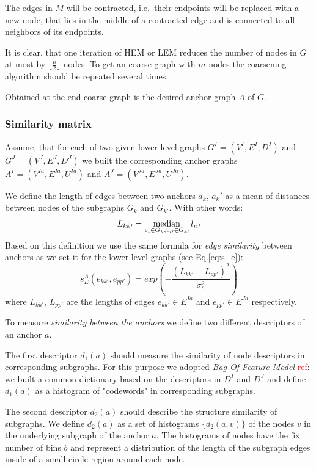\documentclass[
	fontsize=12pt,
	paper=a4,
	twoside=false,
	numbers=noenddot,
	plainheadsepline,
	toc=listof,
	toc=bibliography
]{scrartcl}
\def\median{\mathop{\rm median}} 						%
\newcommand\ToDo[1]{\textcolor{red}{#1}}
\begin{document}
The edges in $M$ will be contracted, i.e.\ their endpoints will be replaced with a new node, that lies in the middle of a contracted edge and is connected to all neighbors of its endpoints.

It is clear, that one iteration of HEM or LEM reduces the number of nodes in $G$ at most by $\lfloor\frac{n}{2} \rfloor$ nodes. To get an coarse graph with $m$ nodes the coarsening algorithm should be repeated several times.

Obtained at the end coarse graph is the desired anchor graph $A$ of $G$. 

\subsubsection{Similarity matrix}

Assume, that for each of two given lower level graphs $G^I = (V^I, E^I, D^I)$ and $G^J=(V^J, E^J, D^J)$ we built the corresponding anchor graphs  $A^I=(V^{Ia},E^{Ia}, U^{Ia})$ and $A^J=(V^{Ja},E^{Ja},U^{Ja})$. 

We define the length of edges between two anchors $a_k$, $a_k\prime$ as a mean of distances between nodes of the subgraphs $G_k$ and $G_{k\prime}$. With other words:
\begin{equation} L_{kk\prime} = \median_{v_i\in G_k, v_{i\prime}\in G_{k\prime}} l_{ii\prime} \end{equation}
Based on this definition we use the same formula for \emph{edge similarity} between anchors as we set it for the lower level graphs (see Eq.\ref{eq:s_e}):
\begin{equation} 
s^A_E(e_{kk\prime}, e_{pp\prime}) = exp(-\frac{(L_{kk\prime} - L_{pp\prime})^2}{\sigma^2_{s}})
\label{eq:s_e_A}
\end{equation}
where $L_{kk\prime}$, $L_{pp\prime} $ are the lengths of edges $e_{kk\prime}\in E^{Ia}$ and $e_{pp\prime}\in E^{Ja}$ respectively.

To measure \emph{similarity between the anchors} we  define two different descriptors of an anchor $a$.

The first descriptor $d_1(a)$ should measure the similarity of node descriptors in corresponding subgraphs. For this purpose we adopted \emph{Bag Of Feature Model} \ToDo{ref}: we built a common dictionary based on the descriptors in $D^I$ and $D^J$ and define $d_1(a)$ as a histogram of "codewords" in corresponding subgraphs.

The second descriptor $d_2(a)$ should describe the structure similarity of subgraphs. We define $d_2(a)$ as a set of histograms $\{d_2(a,v)\}$ of the nodes $v$ in the underlying subgraph of the anchor $a$. The histograms of nodes have the fix number of bins $b$ and represent a distribution of the length of the subgraph edges inside of a small circle region around each node. 
\end{document}
